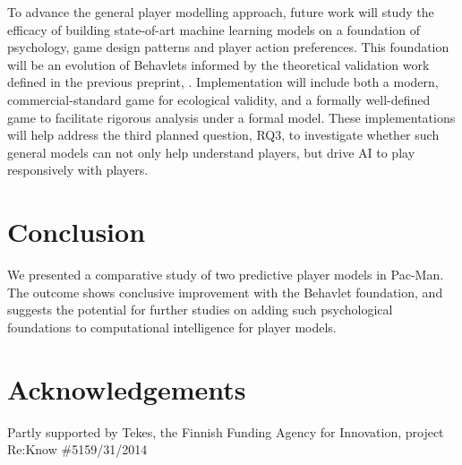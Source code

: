 \documentclass[conference]{IEEEtran}
\begin{document}
To advance the general player modelling approach, future work will study the efficacy of building state-of-art machine learning models on a foundation of psychology, game design patterns and player action preferences. This foundation will be an evolution of Behavlets informed by the theoretical validation work defined in the previous preprint, \cite{Cowley2016pre1}. Implementation will include both a modern, commercial-standard game for ecological validity, and a formally well-defined game to facilitate rigorous analysis under a formal model. These implementations will help address the third planned question, \textsf{RQ3}, to investigate whether such general models can not only help understand players, but drive AI to play responsively with players.


\section{Conclusion}
\label{conc}
We presented a comparative study of two predictive player models in Pac-Man. The outcome shows conclusive improvement with the Behavlet foundation, and suggests the potential for further studies on adding such psychological foundations to computational intelligence for player models.



\section*{Acknowledgements}
Partly supported by Tekes, the Finnish Funding Agency for Innovation, project Re:Know \#5159/31/2014




\end{document}
